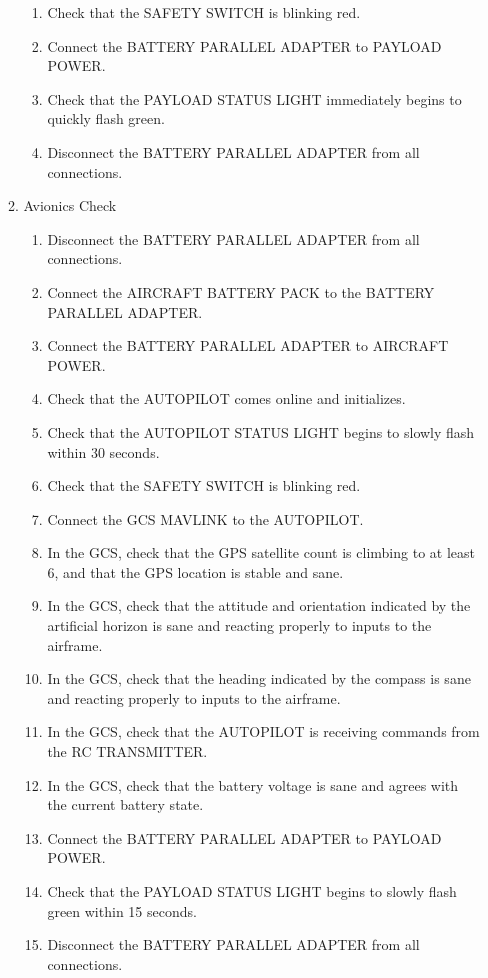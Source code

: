 \documentclass{report}
\begin{document}
\begin{enumerate}
\begin{enumerate}
\begin{enumerate}
							\item Check that the SAFETY SWITCH is blinking red.
							\item Connect the BATTERY PARALLEL ADAPTER to PAYLOAD POWER.
							\item Check that the PAYLOAD STATUS LIGHT immediately begins to quickly flash green.
							\item Disconnect the BATTERY PARALLEL ADAPTER from all connections.
						\end{enumerate}
					\item Avionics Check
						\begin{enumerate}
							\item Disconnect the BATTERY PARALLEL ADAPTER from all connections.
							\item Connect the AIRCRAFT BATTERY PACK to the BATTERY PARALLEL ADAPTER.
							\item Connect the BATTERY PARALLEL ADAPTER to AIRCRAFT POWER.
							\item Check that the AUTOPILOT comes online and initializes.
							\item Check that the AUTOPILOT STATUS LIGHT begins to slowly flash within 30 seconds.
							\item Check that the SAFETY SWITCH is blinking red.
							\item Connect the GCS MAVLINK to the AUTOPILOT.
							\item In the GCS, check that the GPS satellite count is climbing to at least 6, and that the GPS location is stable and sane.
							\item In the GCS, check that the attitude and orientation indicated by the artificial horizon is sane and reacting properly to inputs to the airframe.
							\item In the GCS, check that the heading indicated by the compass is sane and reacting properly to inputs to the airframe.
							\item In the GCS, check that the AUTOPILOT is receiving commands from the RC TRANSMITTER.
							\item In the GCS, check that the battery voltage is sane and agrees with the current battery state.
							\item Connect the BATTERY PARALLEL ADAPTER to PAYLOAD POWER.
							\item Check that the PAYLOAD STATUS LIGHT begins to slowly flash green within 15 seconds.
							\item Disconnect the BATTERY PARALLEL ADAPTER from all connections.

\end{enumerate}
\end{enumerate}
\end{enumerate}
\end{document}
